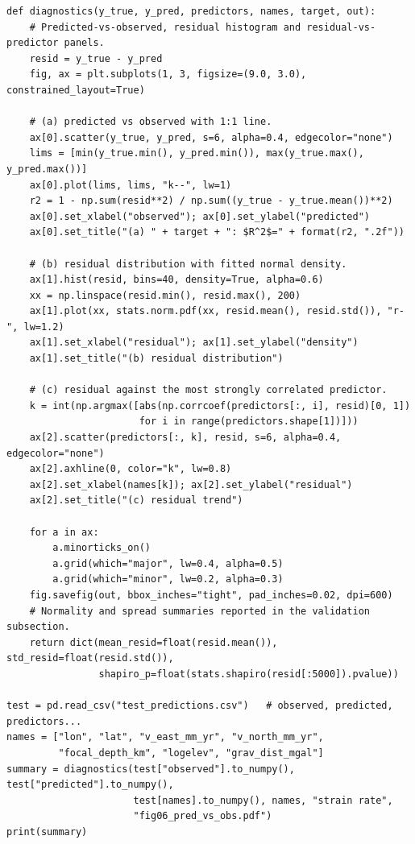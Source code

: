 \documentclass[pdflatex,sn-mathphys-num]{sn-jnl}%
\theoremstyle{thmstyleone}%
\theoremstyle{thmstyletwo}%
\theoremstyle{thmstylethree}%
\begin{document}
\begin{appendices}
\begin{lstlisting}
def diagnostics(y_true, y_pred, predictors, names, target, out):
    # Predicted-vs-observed, residual histogram and residual-vs-predictor panels.
    resid = y_true - y_pred
    fig, ax = plt.subplots(1, 3, figsize=(9.0, 3.0), constrained_layout=True)

    # (a) predicted vs observed with 1:1 line.
    ax[0].scatter(y_true, y_pred, s=6, alpha=0.4, edgecolor="none")
    lims = [min(y_true.min(), y_pred.min()), max(y_true.max(), y_pred.max())]
    ax[0].plot(lims, lims, "k--", lw=1)
    r2 = 1 - np.sum(resid**2) / np.sum((y_true - y_true.mean())**2)
    ax[0].set_xlabel("observed"); ax[0].set_ylabel("predicted")
    ax[0].set_title("(a) " + target + ": $R^2$=" + format(r2, ".2f"))

    # (b) residual distribution with fitted normal density.
    ax[1].hist(resid, bins=40, density=True, alpha=0.6)
    xx = np.linspace(resid.min(), resid.max(), 200)
    ax[1].plot(xx, stats.norm.pdf(xx, resid.mean(), resid.std()), "r-", lw=1.2)
    ax[1].set_xlabel("residual"); ax[1].set_ylabel("density")
    ax[1].set_title("(b) residual distribution")

    # (c) residual against the most strongly correlated predictor.
    k = int(np.argmax([abs(np.corrcoef(predictors[:, i], resid)[0, 1])
                       for i in range(predictors.shape[1])]))
    ax[2].scatter(predictors[:, k], resid, s=6, alpha=0.4, edgecolor="none")
    ax[2].axhline(0, color="k", lw=0.8)
    ax[2].set_xlabel(names[k]); ax[2].set_ylabel("residual")
    ax[2].set_title("(c) residual trend")

    for a in ax:
        a.minorticks_on()
        a.grid(which="major", lw=0.4, alpha=0.5)
        a.grid(which="minor", lw=0.2, alpha=0.3)
    fig.savefig(out, bbox_inches="tight", pad_inches=0.02, dpi=600)
    # Normality and spread summaries reported in the validation subsection.
    return dict(mean_resid=float(resid.mean()), std_resid=float(resid.std()),
                shapiro_p=float(stats.shapiro(resid[:5000]).pvalue))

test = pd.read_csv("test_predictions.csv")   # observed, predicted, predictors...
names = ["lon", "lat", "v_east_mm_yr", "v_north_mm_yr",
         "focal_depth_km", "logelev", "grav_dist_mgal"]
summary = diagnostics(test["observed"].to_numpy(), test["predicted"].to_numpy(),
                      test[names].to_numpy(), names, "strain rate",
                      "fig06_pred_vs_obs.pdf")
print(summary)
\end{lstlisting}


\end{appendices}
\end{document}

